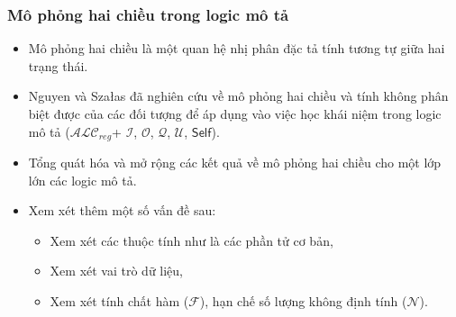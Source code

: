 \documentclass[notheorems,xcolor=dvipsnames]{beamer}
\newcommand{\mI}		{\mathcal{I}}
\newcommand{\mO}		{\mathcal{O}}
\newcommand{\mN}		{\mathcal{N}}
\newcommand{\mQ}		{\mathcal{Q}}
\newcommand{\mF}		{\mathcal{F}}
\newcommand{\mU}		{\mathcal{U}}
\newcommand{\Self}		{\mathsf{Self}}
\newcommand{\ALCreg}	{$\mathcal{ALC}_{reg}$\xspace}
\begin{document}
\begin{frame}\frametitle{\bf Mô phỏng hai chiều trong logic mô tả}
	\vspace{-0.5ex}
	\begin{itemize}
		\setlength{\itemsep}{2.0ex}
		\item Mô phỏng hai chiều là một quan hệ nhị phân đặc tả tính tương
		tự giữa hai trạng thái.
		
		
		\item Nguyen và Sza{\l}as đã nghiên cứu về mô phỏng hai chiều và tính
		không phân biệt được của các đối tượng để áp dụng vào việc học khái niệm trong logic mô tả (\ALCreg + $\mI$, $\mO$, $\mQ$, $\mU$, $\Self$). 
		
		\item Tổng quát hóa và mở rộng các kết quả về mô phỏng hai chiều cho một lớp lớn các logic mô tả.
		
		\item Xem xét thêm một số vấn đề sau:  
		\begin{itemize}
			\setlength{\itemsep}{1.5ex}
			\item Xem xét các thuộc tính như là các phần tử cơ bản, 
			
			\item Xem xét vai trò dữ liệu,
			
			\item Xem xét tính chất hàm ($\mF$), hạn chế số lượng không định tính ($\mN$).
		\end{itemize}
	\end{itemize}
\end{frame}
\end{document}
